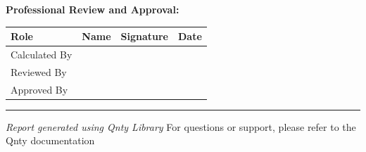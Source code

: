 \documentclass[11pt,a4paper]{article}
\begin{document}
\vspace{2em}

\noindent\textbf{Professional Review and Approval:}

\vspace{1em}

\begin{longtable}{|p{3cm}|p{4cm}|p{4cm}|p{2.5cm}|}
\hline
\textbf{Role} & \textbf{Name} & \textbf{Signature} & \textbf{Date} \\
\hline
\hline
Calculated By & \rule{0pt}{1.5cm} & & \\
\hline
Reviewed By & \rule{0pt}{1.5cm} & & \\
\hline
Approved By & \rule{0pt}{1.5cm} & & \\
\hline
\end{longtable}

\vspace{1em}

\begin{center}
\rule{\textwidth}{0.4pt}
\vspace{0.5em}
\textit{Report generated using Qnty Library}
\vspace{0.5em}
{\footnotesize For questions or support, please refer to the Qnty documentation}
\end{center}
\end{document}
